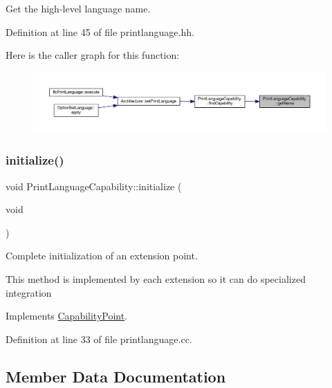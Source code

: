 Get the high-\/level language name. 



Definition at line 45 of file printlanguage.\+hh.

Here is the caller graph for this function\+:
\nopagebreak
\begin{figure}[H]
\begin{center}
\leavevmode
\includegraphics[width=350pt]{class_print_language_capability_abca4d334109a9e47968240cccbf72236_icgraph}
\end{center}
\end{figure}
\mbox{\label{class_print_language_capability_ac0c50c753c0e5b11a97ce789f18d33c7}} 
\subsubsection{\texorpdfstring{initialize()}{initialize()}}
{\footnotesize\ttfamily void Print\+Language\+Capability\+::initialize (\begin{DoxyParamCaption}\item[{void}]{ }\end{DoxyParamCaption})\hspace{0.3cm}{\ttfamily [virtual]}}



Complete initialization of an extension point. 

This method is implemented by each extension so it can do specialized integration 

Implements \mbox{\hyperlink{class_capability_point_a493d24125e7e024a9b2d6c2ad4bfbfab}{Capability\+Point}}.



Definition at line 33 of file printlanguage.\+cc.



\subsection{Member Data Documentation}
\mbox{\label{class_print_language_capability_ac59b85a0cca4d610739ae88a614361bc}} 
